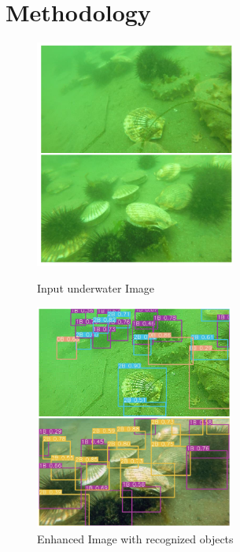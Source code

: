 \section{Methodology}

\begin{figure}[tb]
    \begin{minipage}{0.48\textwidth}
      \centering
      \includegraphics[width=.7\linewidth]{figures/pre-processing.png}
      \caption{Input underwater Image}
      \label{Fig:PreProcessing}
    \end{minipage}\hfill
    \begin{minipage}{0.48\textwidth}
      \centering
      \includegraphics[width=.7\linewidth]{figures/post-processing.png}
      \caption{Enhanced Image with recognized objects}
      \label{Fig:PostProcessing}
    \end{minipage}
\end{figure}

